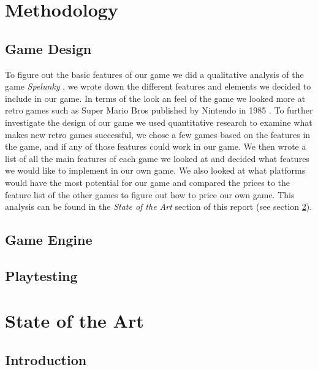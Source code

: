 \documentclass[12p]{article}
\begin{document}
\newpage
\section{Methodology} \label{Methodology}

\subsection{Game Design}

To figure out the basic features of our game we did a qualitative analysis of the game \emph{Spelunky} \cite{Spelunky}, we wrote down the different features and elements we decided to include in our game. In terms of the look an feel of the game we looked more at retro games such as Super Mario Bros published by Nintendo in 1985 \cite{SuperMarioBros}. To further investigate the design of our game we used quantitative research to examine what makes new retro games successful, we chose a few games based on the features in the game, and if any of those features could work in our game. We then wrote a list of all the main features of each game we looked at and decided what features we would like to implement in our own game. We also looked at what platforms would have the most potential for our game and compared the prices to the feature list of the other games to figure out how to price our own game. This analysis can be found in the \emph{State of the Art} section of this report (see section \ref{sec:StateOfTheArt}).

\subsection{Game Engine}


\subsection{Playtesting}




\newpage
\section{State of the Art} \label{sec:StateOfTheArt}
\subsection{Introduction}
\end{document}

